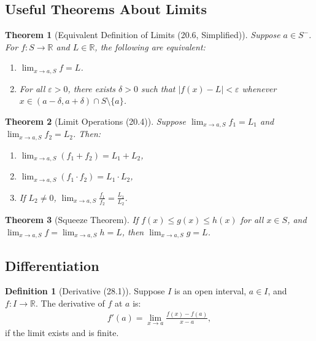 \documentclass[9pt]{article}
\theoremstyle{definition}
\newtheorem{definition}{Definition}
\theoremstyle{plain}
\newtheorem{theorem}{Theorem}
\begin{document}
\subsection*{Useful Theorems About Limits}
\begin{theorem}[Equivalent Definition of Limits (20.6, Simplified)]
Suppose $ a \in S^- $. For $ f : S \to \mathbb{R} $ and $ L \in \mathbb{R} $, the following are equivalent:
\begin{enumerate}
    \item $ \lim_{x \to a, S} f = L $.
    \item For all $ \varepsilon > 0 $, there exists $ \delta > 0 $ such that $ |f(x) - L| < \varepsilon $ whenever $ x \in (a - \delta, a + \delta) \cap S \setminus \{a\} $.
\end{enumerate}
\end{theorem}

\begin{theorem}[Limit Operations (20.4)]
Suppose $ \lim_{x \to a, S} f_1 = L_1 $ and $ \lim_{x \to a, S} f_2 = L_2 $. Then:
\begin{enumerate}
    \item $ \lim_{x \to a, S} (f_1 + f_2) = L_1 + L_2 $,
    \item $ \lim_{x \to a, S} (f_1 \cdot f_2) = L_1 \cdot L_2 $,
    \item If $ L_2 \neq 0 $, $ \lim_{x \to a, S} \frac{f_1}{f_2} = \frac{L_1}{L_2} $.
\end{enumerate}
\end{theorem}

\begin{theorem}[Squeeze Theorem]
If $ f(x) \leq g(x) \leq h(x) $ for all $ x \in S $, and $ \lim_{x \to a, S} f = \lim_{x \to a, S} h = L $, then $ \lim_{x \to a, S} g = L $.
\end{theorem}

\subsection*{Differentiation}
\begin{definition}[Derivative (28.1)]
Suppose $ I $ is an open interval, $ a \in I $, and $ f : I \to \mathbb{R} $. The derivative of $ f $ at $ a $ is:
\begin{align}
f'(a) = \lim_{x \to a} \frac{f(x) - f(a)}{x - a},
\end{align}
if the limit exists and is finite.
\end{definition}
\end{document}
